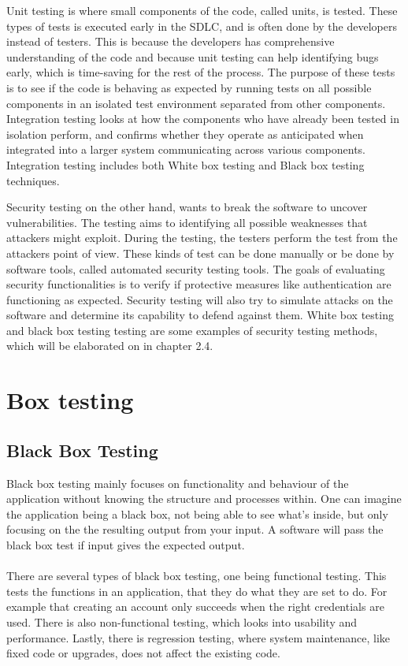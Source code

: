 Unit testing is where small components of the code, called units, is tested. These types of tests is executed early in the SDLC, and is often done by the developers instead of testers. This is because the developers has comprehensive understanding of the code and because unit testing can help identifying bugs early, which is time-saving for the rest of the process. The purpose of these tests is to see if the code is behaving as expected by running tests on all possible components in an isolated test environment separated from other components. Integration testing looks at how the components who have already been tested in isolation perform, and confirms whether they operate as anticipated when integrated into a larger system communicating across various components. Integration testing includes both White box testing and Black box testing techniques.\cite{unitvsintergration}

Security testing on the other hand, wants to break the software to uncover vulnerabilities. The testing aims to identifying all possible weaknesses that attackers might exploit. During the testing, the testers perform the test from the attackers point of view. These kinds of test can be done manually or be done by software tools, called automated security testing tools. The goals of evaluating security functionalities is to verify if protective measures like authentication are functioning as expected. Security testing will also try to simulate attacks on the software and determine its capability to defend against them. White box testing and black box testing testing are some examples of security testing methods, which will be elaborated on in chapter 2.4.\cite{whysectest}


\section{Box testing}
\subsection{Black Box Testing}
Black box testing mainly focuses on functionality and behaviour of the application without knowing the structure and processes within. One can imagine the application being a black box, not being able to see what's inside, but only focusing on the the resulting output from your input. A software will pass the black box test if input gives the expected output. \cite{blackbox}
\\~\\
There are several types of black box testing, one being functional testing. This tests the functions in an application, that they do what they are set to do. For example that creating an account only succeeds when the right credentials are used. There is also non-functional testing, which looks into usability and performance. Lastly, there is regression testing, where system maintenance, like fixed code or upgrades, does not affect the existing code. 


